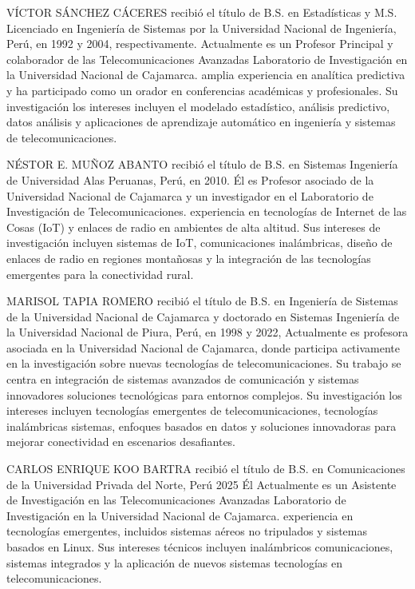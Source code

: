 \documentclass{ieeeaccess}
\begin{document}
\begin{IEEEbiographynophoto}{VÍCTOR SÁNCHEZ CÁCERES}
recibió el título de B.S. en Estadísticas y M.S. Licenciado en Ingeniería de Sistemas por la Universidad Nacional de Ingeniería, Perú, en 1992 y 2004, respectivamente. Actualmente es un Profesor Principal y colaborador de las Telecomunicaciones Avanzadas Laboratorio de Investigación en la Universidad Nacional de Cajamarca. amplia experiencia en analítica predictiva y ha participado como un orador en conferencias académicas y profesionales. Su investigación los intereses incluyen el modelado estadístico, análisis predictivo, datos análisis y aplicaciones de aprendizaje automático en ingeniería y sistemas de telecomunicaciones.
\end{IEEEbiographynophoto}

\begin{IEEEbiographynophoto}{NÉSTOR E. MUÑOZ ABANTO}
recibió el título de B.S. en Sistemas Ingeniería de Universidad Alas Peruanas, Perú, en 2010. Él es Profesor asociado de la Universidad Nacional de Cajamarca y un investigador en el Laboratorio de Investigación de Telecomunicaciones. experiencia en tecnologías de Internet de las Cosas (IoT) y enlaces de radio en ambientes de alta altitud. Sus intereses de investigación incluyen sistemas de IoT, comunicaciones inalámbricas, diseño de enlaces de radio en regiones montañosas y la integración de las tecnologías emergentes para la conectividad rural.
\end{IEEEbiographynophoto}

\begin{IEEEbiographynophoto}{MARISOL TAPIA ROMERO}
recibió el título de B.S. en Ingeniería de Sistemas de la Universidad Nacional de Cajamarca y doctorado en Sistemas Ingeniería de la Universidad Nacional de Piura, Perú, en 1998 y 2022, Actualmente es profesora asociada en la Universidad Nacional de Cajamarca, donde participa activamente en la investigación sobre nuevas tecnologías de telecomunicaciones. Su trabajo se centra en integración de sistemas avanzados de comunicación y sistemas innovadores soluciones tecnológicas para entornos complejos. Su investigación los intereses incluyen tecnologías emergentes de telecomunicaciones, tecnologías inalámbricas sistemas, enfoques basados en datos y soluciones innovadoras para mejorar conectividad en escenarios desafiantes.
\end{IEEEbiographynophoto}

\begin{IEEEbiographynophoto}{CARLOS ENRIQUE KOO BARTRA}
recibió el título de B.S. en Comunicaciones de la Universidad Privada del Norte, Perú 2025 Él Actualmente es un Asistente de Investigación en las Telecomunicaciones Avanzadas Laboratorio de Investigación en la Universidad Nacional de Cajamarca. experiencia en tecnologías emergentes, incluidos sistemas aéreos no tripulados y sistemas basados en Linux. Sus intereses técnicos incluyen inalámbricos comunicaciones, sistemas integrados y la aplicación de nuevos sistemas tecnologías en telecomunicaciones.
\end{IEEEbiographynophoto}
\EOD
\end{document}
